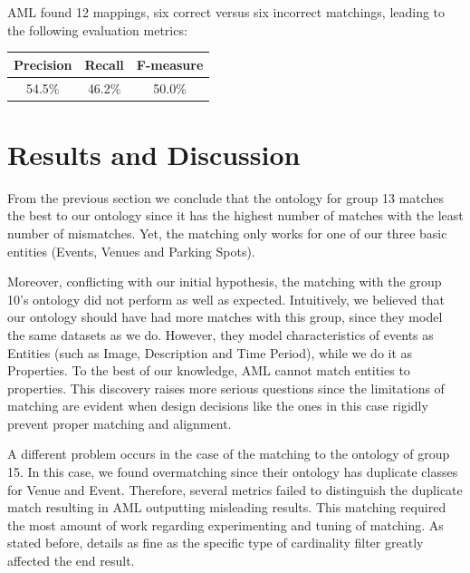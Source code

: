 \documentclass[runningheads,a4paper]{../../StyleFiles/llncs}
\begin{document}
AML found 12 mappings, six correct versus six incorrect matchings, leading to the following evaluation metrics: 

\begin{center}
	\begin{tabular}{| c | c | c |}
		\hline
		\textbf{Precision} & \textbf{Recall} & \textbf{F-measure} \\ \hline
		54.5\% & 46.2\% & 50.0\% \\ \hline
	\end{tabular}
\end{center}


\section{Results and Discussion}
From the previous section we conclude that the ontology for group 13 matches the best to our ontology since it has the highest number of matches with the least number of mismatches. Yet, the matching only works for one of our three basic entities (Events, Venues and Parking Spots). 

Moreover, conflicting with our initial hypothesis, the matching with the group 10's ontology did not perform as well as expected. Intuitively, we believed that our ontology should have had more matches with this group, since they model the same datasets as we do. However, they model characteristics of events as Entities (such as Image, Description and Time Period), while we do it as Properties. To the best of our knowledge, AML cannot match entities to properties. This discovery raises more serious questions since the limitations of matching are evident when design decisions like the ones in this case rigidly prevent proper matching and alignment.

A different problem occurs in the case of the matching to the ontology of group 15. In this case, we found overmatching since their ontology has duplicate classes for Venue and Event. Therefore, several metrics failed to distinguish the duplicate match resulting in AML outputting misleading results. This matching required the most amount of work regarding experimenting and tuning of matching. As stated before, details as fine as the specific type of cardinality filter greatly affected the end result. 
\end{document}
